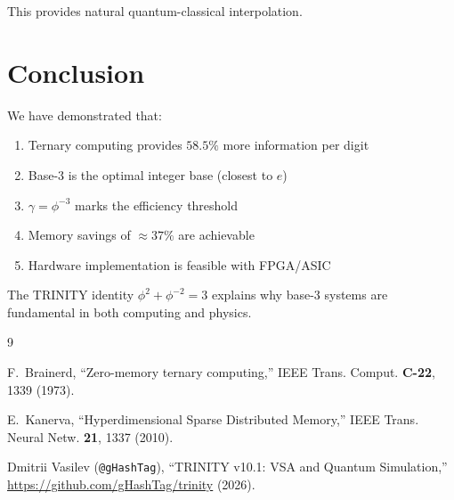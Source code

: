 \documentclass[12pt,a4paper]{article}
\begin{document}
This provides natural quantum-classical interpolation.

\section{Conclusion}

We have demonstrated that:
\begin{enumerate}
\item Ternary computing provides $58.5\%$ more information per digit
\item Base-3 is the optimal integer base (closest to $e$)
\item $\gamma = \phi^{-3}$ marks the efficiency threshold
\item Memory savings of $\approx 37\%$ are achievable
\item Hardware implementation is feasible with FPGA/ASIC
\end{enumerate}

The TRINITY identity $\phi^2 + \phi^{-2} = 3$ explains why base-3 systems are fundamental in both computing and physics.

\begin{thebibliography}{9}

F.~Brainerd,
``Zero-memory ternary computing,''
IEEE Trans. Comput. \textbf{C-22}, 1339 (1973).

E.~Kanerva,
``Hyperdimensional Sparse Distributed Memory,''
IEEE Trans. Neural Netw. \textbf{21}, 1337 (2010).

Dmitrii Vasilev (\texttt{@gHashTag}),
``TRINITY v10.1: VSA and Quantum Simulation,''
\url{https://github.com/gHashTag/trinity} (2026).

\end{thebibliography}
\end{document}
